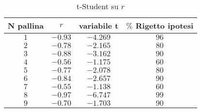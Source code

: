 \documentclass[a4paper,11pt,oneside]{article}
\begin{document}
\begin{table}[h!]
\caption{t-Student su $r$}
\label{tab:t_student}
\vspace{0.2cm}
\centering
\begin{tabular}{|c|c|c|c|}
\hline
 \textbf{N pallina} & \textbf{$r$} & \textbf{variabile t} & \textbf{{$\%$ Rigetto ipotesi}} \\ \hline
\rowcolor[rgb]{0.85,0.85,0.85}$1$ & $-0.93$ & $-4.269$ & $96$ \\ \hline
 $2$ & $-0.78$ & $-2.165$ & $80$ \\ \hline
\rowcolor[rgb]{0.85,0.85,0.85}$3$ & $-0.88$ & $-3.162$ & $90$ \\ \hline
 $4$ & $-0.56$ & $-1.175$ & $60$ \\ \hline
\rowcolor[rgb]{0.85,0.85,0.85}$5$ & $-0.77$ & $-2.078$ & $80$ \\ \hline
 $6$ & $-0.84$ & $-2.657$ & $90$ \\ \hline
\rowcolor[rgb]{0.85,0.85,0.85}$7$ & $-0.55$ & $-1.138$ & $60$ \\ \hline
 $8$ & $-0.97$ & $-6.747$ & $99$ \\ \hline
\rowcolor[rgb]{0.85,0.85,0.85}$9$ & $-0.70$ & $-1.703$ & $90$ \\ \hline
\end{tabular}
\end{table}


\newpage%
\end{document}
